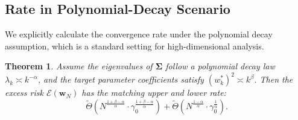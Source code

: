 \documentclass{article}
\theoremstyle{definition}
\theoremstyle{definition}
\theoremstyle{plain}
\newtheorem{theorem}{Theorem}
\theoremstyle{plain}
\theoremstyle{plain}
\theoremstyle{plain}
\theoremstyle{plain}
\newcommand{\bs}[1]{\boldsymbol{\mathbf{#1}}}
\begin{document}
\subsection{Rate in Polynomial-Decay Scenario}
\label{subsec:polydecaybound}

We explicitly calculate the convergence rate under the polynomial decay assumption, which is a standard setting for high-dimensional analysis.

\begin{theorem}
    Assume the eigenvalues of $\bs\Sigma$ follow a polynomial decay law $\lambda_k \asymp k^{-\alpha}$, and the target parameter coefficients satisfy $(w_k^*)^2 \asymp k^{\beta}$. Then the excess risk $\mathcal{E}(\bs w_N)$ has the matching upper and lower rate:
    \begin{equation}
        \tilde{{\Theta}}\left(N^{\frac{1+\beta-\alpha}{\alpha}}\cdot\gamma_0^{\frac{1+\beta-\alpha}{\alpha}}\right) + \tilde{{\Theta}}\left(N^{\frac{1-\alpha}{\alpha}}\cdot\gamma_0^{\frac{1}{\alpha}}\right).
    \end{equation}
\end{theorem}
\end{document}

